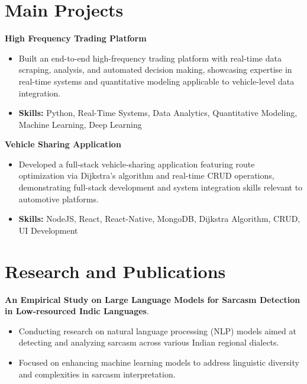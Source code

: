 \documentclass[a4paper,11pt]{article}
\begin{document}
\section{\textbf{Main Projects}}

\vspace{1mm}
  \textbf{High Frequency Trading Platform  }
\vspace{-1.5mm} %
\begin{itemize}
  \item Built an end-to-end high-frequency trading platform with real-time data scraping, analysis, and automated decision making, showcasing expertise in real-time systems and quantitative modeling applicable to vehicle-level data integration.
\vspace{-3mm}
  \item \textbf{Skills:} Python, Real-Time Systems, Data Analytics, Quantitative Modeling, Machine Learning, Deep Learning
\end{itemize}


\vspace{1mm}
   \textbf{Vehicle Sharing Application }
\vspace{-1.5mm} %
\begin{itemize}
  \item Developed a full-stack vehicle-sharing application featuring route optimization via Dijkstra's algorithm and real-time CRUD operations, demonstrating full-stack development and system integration skills relevant to automotive platforms.
\vspace{-3mm}
  \item \textbf{Skills:} NodeJS, React, React-Native, MongoDB, Dijkstra Algorithm, CRUD, UI Development
\end{itemize}



\section{\textbf{Research and Publications} \hfill }
\vspace{1mm}
  \textbf{An Empirical Study on Large Language Models for Sarcasm Detection in Low-resourced Indic Languages}.
\vspace{-1mm} %
\begin{itemize}
  \item Conducting research on natural language processing (NLP) models aimed at detecting and analyzing sarcasm across various Indian regional dialects.
\vspace{-3mm}
  \item Focused on enhancing machine learning models to address linguistic diversity and complexities in sarcasm interpretation.
\end{itemize}
\end{document}
